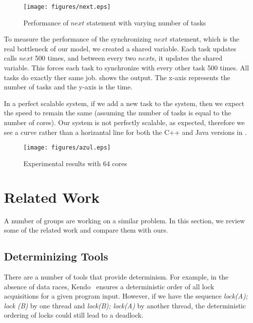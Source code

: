 \documentclass[10pt, conference, compsocconf]{IEEEtran}
\begin{document}
\begin{figure}[htbp]
\texttt{[image: figures/next.eps]}
\caption{Performance of $next$ statement with varying number of tasks}
\label{fig:next}
\end{figure}


To measure the performance of the synchronizing $next$ statement, which
is the real bottleneck of our model, we created a shared variable.
Each task updates calls $next$ 500 times, and between every two $next$s, it
updates the shared variable. This  forces
each task to synchronize with every other task 500 times.
All tasks do exactly ther same job.  shows the output.
The x-axis represents the number of tasks and the y-axis is the time.

In a perfect scalable system, if we add a new task to the system, then we 
expect the  speed to remain the same (assuming the number of tasks is  
 equal to the number of cores). Our system is not perfectly scalable,
as expected, therefore we see a curve rather than a horizantal line for both
the C++ and Java versions in .



\begin{figure*}[htbp]
\texttt{[image: figures/azul.eps]}
\caption{Experimental results with 64 cores }
\label{fig:azul}
\end{figure*}



\section{Related Work}
\label{sec:related}

A number of groups are working on a similar problem.
In this section, we review some of the related work
and compare them with ours.
 
\subsection{Determinizing Tools} 
 
There are a number of tools that provide determinism. For example, 
in the absence of data races, Kendo~\cite{olszewski2009kendo} ensures 
a deterministic order of all lock acquisitions for a given program input. 
However, if we have the sequence \emph{lock(A); lock (B)} by one thread 
and \emph{lock(B); lock(A)} by another thread, the deterministic ordering 
of locks could still lead to a deadlock. 
 
\end{document}
